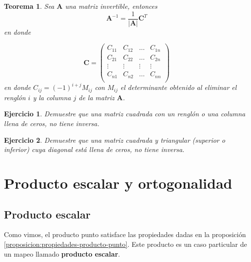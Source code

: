 \documentclass[11pt]{report}
\theoremstyle{break}
\newtheorem{teorema}{Teorema}[chapter]
\newtheorem{ejercicio}{Ejercicio}[chapter]
\theoremstyle{break}
\begin{document}
\begin{teorema}
Sea $\bm{A}$ una matriz invertible, entonces
$$
\bm{A}^{-1} = \dfrac{1}{|\bm{A}|} \bm{C}^{T}
$$
en donde 

$$
\bm{C} =
\begin{pmatrix}
C_{11} & C_{12} & \ldots & C_{1n} \\
C_{21} & C_{22} & \ldots & C_{2n} \\
\vdots & \vdots & \vdots & \vdots \\
C_{n1} & C_{n2} & \ldots & C_{nn} \\
\end{pmatrix}
$$
en donde $C_{ij} = (-1)^{i + j}M_{ij}$ con $M_{ij}$ el determinante obtenido al eliminar el renglón $i$ y la columna $j$ de la matriz $\bm{A}$.
\end{teorema}

\begin{ejercicio}
Demuestre que una matriz cuadrada con un renglón o una columna llena de ceros, no tiene inversa.
\end{ejercicio}

\begin{ejercicio}
Demuestre que una matriz cuadrada y triangular (superior o inferior) cuya diagonal está llena de ceros, no tiene inversa.
\end{ejercicio}

\chapter{Producto escalar y ortogonalidad}
\label{capitulo:productos-escalares}

\section{Producto escalar}
\label{seccion:producto-escalar}
Como vimos, el producto punto satisface las propiedades dadas en la proposición \ref{proposicion:propiedades-producto-punto}. Este producto es un caso particular de un mapeo llamado \textbf{producto escalar}.
\end{document}
